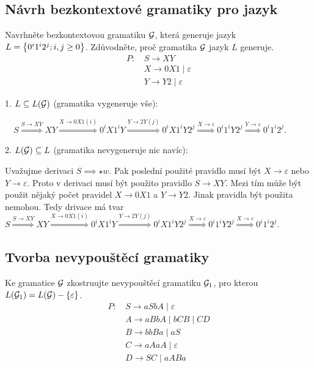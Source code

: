 \subsection{Návrh bezkontextové gramatiky pro jazyk}
Navrhněte bezkontextovou gramatiku $\mathcal{G}$, která generuje jazyk $L = \left\lbrace 0^i 1^i 2^j; i, j \geq 0 \right\rbrace$. Zdůvodněte,
proč gramatika $\mathcal{G}$ jazyk $L$ generuje.
    \begin{align*}
        P\text{: } & S \rightarrow XY  \\
        & X \rightarrow 0X1 \mid \varepsilon  \\
        & Y \rightarrow Y2 \mid \varepsilon
    \end{align*}

1. $L \subseteq L(\mathcal{G})$ (gramatika vygeneruje vše):

$\quad S \stackrel{S \rightarrow XY}{\Longrightarrow} XY \stackrel{X \rightarrow 0X1 (i)}{\Longrightarrow} 0^iX1^iY
\stackrel{Y \rightarrow 2Y(j)}{\Longrightarrow} 0^iX1^iY2^j \stackrel{X \rightarrow \varepsilon}{\Longrightarrow}
0^i1^iY2^j\stackrel{Y \rightarrow \varepsilon}{\Longrightarrow} 0^i1^i2^j $.

2. $L(\mathcal{G}) \subseteq L$ (gramatika nevygeneruje nic navíc):

Uvažujme derivaci $S \implies\star w$. Pak poslední použité pravidlo musí být $X \rightarrow \varepsilon$ nebo
$Y \rightarrow \varepsilon$. Proto v derivaci musí být použito pravidlo $S \rightarrow XY$. Mezi tím může být použit
nějaký počet pravidel $X \rightarrow 0X1$ a $Y \rightarrow Y2$. Jinak pravidla být použita nemohou. Tedy drivace má tvar
$ S \stackrel{S \rightarrow XY}{\Longrightarrow} XY \stackrel{X \rightarrow 0X1 (i)}{\Longrightarrow} 0^iX1^iY
\stackrel{Y \rightarrow 2Y(j)}{\Longrightarrow} 0^iX1^iY2^j \stackrel{X \rightarrow \varepsilon}{\Longrightarrow}
0^i1^iY2^j\stackrel{X \rightarrow \varepsilon}{\Longrightarrow} 0^i1^i2^j $.

\subsection{Tvorba nevypouštěcí gramatiky}
Ke gramatice $\mathcal{G}$ zkostruujte nevypouštěcí gramatiku $\mathcal{G}_1$, pro kterou $L(\mathcal{G}_1) = L(\mathcal{G}) - \left\lbrace \varepsilon \right\rbrace$.
    \begin{align*}
        P\text{: } & S \rightarrow aSbA \mid \varepsilon \\
           & A \rightarrow aBbA \mid bCB \mid CD \\
           & B \rightarrow bbBa \mid aS \\
           & C \rightarrow aAaA \mid \varepsilon \\
           & D \rightarrow SC \mid aABa
    \end{align*}

